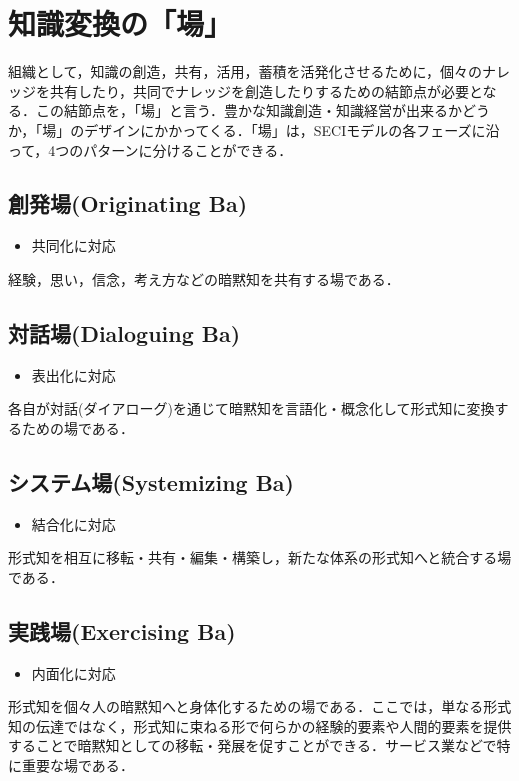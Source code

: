 \section{知識変換の「場」}
組織として，知識の創造，共有，活用，蓄積を活発化させるために，個々のナレッジを共有したり，共同でナレッジを創造したりするための結節点が必要となる．この結節点を，「場」と言う．豊かな知識創造・知識経営が出来るかどうか，「場」のデザインにかかってくる．「場」は，SECIモデルの各フェーズに沿って，4つのパターンに分けることができる\cite{ba}．


\subsection{創発場(Originating Ba)}
\begin{itemize}
  \item 共同化に対応
\end{itemize}

経験，思い，信念，考え方などの暗黙知を共有する場である\cite{ba}．

\subsection{対話場(Dialoguing Ba)}
\begin{itemize}
  \item 表出化に対応
\end{itemize}

各自が対話(ダイアローグ)を通じて暗黙知を言語化・概念化して形式知に変換するための場である\cite{ba}．

\subsection{システム場(Systemizing Ba)}
\begin{itemize}
  \item 結合化に対応
\end{itemize}

形式知を相互に移転・共有・編集・構築し，新たな体系の形式知へと統合する場である\cite{ba}．

\subsection{実践場(Exercising Ba)}
\begin{itemize}
  \item 内面化に対応
\end{itemize}

形式知を個々人の暗黙知へと身体化するための場である．ここでは，単なる形式知の伝達ではなく，形式知に束ねる形で何らかの経験的要素や人間的要素を提供することで暗黙知としての移転・発展を促すことができる．サービス業などで特に重要な場である\cite{ba}．

